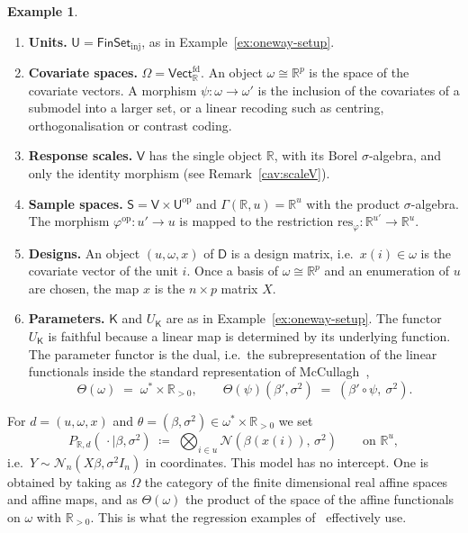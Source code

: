 \documentclass[11pt,a4paper]{article}
\theoremstyle{plain}
\theoremstyle{definition}
\newtheorem{example}[theorem]{Example}
\theoremstyle{remark}
\newcommand{\cat}[1]{\mathsf{#1}}
\newcommand{\catU}{\cat{U}}
\newcommand{\catV}{\cat{V}}
\newcommand{\catO}{\cat{\Omega}}
\newcommand{\catS}{\cat{S}}
\newcommand{\catD}{\cat{D}}
\newcommand{\catK}{\cat{K}}
\newcommand{\FinSet}{\cat{FinSet}}
\newcommand{\op}{\mathrm{op}}
\newcommand{\R}{\mathbb{R}}
\newcommand{\Vect}{\cat{Vect}}
\newcommand{\Norm}{\mathcal{N}}
\newcommand{\res}{\mathrm{res}}
\begin{document}
\begin{example}\label{ex:linreg}
\leavevmode
\begin{enumerate}
\item \textbf{Units.} $\catU = \FinSet_{\mathrm{inj}}$, as in
Example~\ref{ex:oneway-setup}.

\item \textbf{Covariate spaces.} $\catO = \Vect_{\R}^{\mathrm{fd}}$. An object
$\omega \cong \R^{p}$ is the space of the covariate vectors. A morphism
$\psi \colon \omega \to \omega'$ is the inclusion of the covariates of a
submodel into a larger set, or a linear recoding such as centring,
orthogonalisation or contrast coding.

\item \textbf{Response scales.} $\catV$ has the single object $\R$, with its
Borel $\sigma$-algebra, and only the identity morphism (see
Remark~\ref{cav:scaleV}).

\item \textbf{Sample spaces.} $\catS = \catV\times\catU^{\op}$ and
$\Gamma(\R,u) = \R^{u}$ with the product $\sigma$-algebra. The morphism
$\varphi^{\op}\colon u' \to u$ is mapped to the restriction
$\res_\varphi \colon \R^{u'} \to \R^{u}$.

\item \textbf{Designs.} An object $(u,\omega,x)$ of $\catD$ is a design
matrix, i.e.\ $x(i) \in \omega$ is the covariate vector of the unit $i$. Once a
basis of $\omega\cong\R^{p}$ and an enumeration of $u$ are chosen, the map $x$
is the $n\times p$ matrix $X$.

\item \textbf{Parameters.} $\catK$ and $U_{\catK}$ are as in
Example~\ref{ex:oneway-setup}. The functor $U_{\catK}$ is faithful because a
linear map is determined by its underlying function. The parameter functor is
the dual, i.e.\ the subrepresentation of the linear functionals inside the
standard representation of
McCullagh~\cite[\S4.2, p.~1235]{mccullagh_what_2002},
\[
\Theta(\omega) \;=\; \omega^{*}\times\R_{>0},
\qquad
\Theta(\psi)(\beta',\sigma^{2}) \;=\; (\beta'\circ\psi,\ \sigma^{2}) .
\]
\end{enumerate}

\noindent For $d=(u,\omega,x)$ and
$\theta = (\beta,\sigma^{2}) \in \omega^{*}\times\R_{>0}$ we set
\[
P_{\R,d}(\,\cdot \mid \beta,\sigma^{2})
\;\coloneqq\; \bigotimes_{i\in u} \Norm(\beta(x(i)),\,\sigma^{2})
\qquad\text{on } \R^{u},
\]
i.e.\ $Y \sim \Norm_{n}(X\beta,\sigma^{2}I_{n})$ in coordinates. This model has
no intercept. One is obtained by taking as $\catO$ the category of the finite
dimensional real affine spaces and affine maps, and as $\Theta(\omega)$ the
product of the space of the affine functionals on $\omega$ with $\R_{>0}$. This
is what the regression examples of~\cite[\S6]{mccullagh_what_2002} effectively
use.
\end{example}
\end{document}
